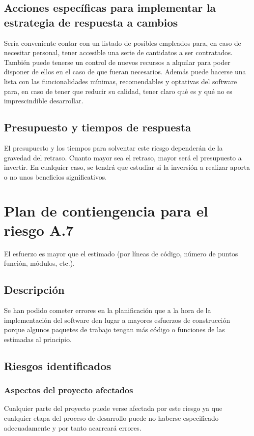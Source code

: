 \documentclass[11pt,a4paper,spanish,twoside]{report}
\begin{document}
\subsection{Acciones específicas para implementar la estrategia de respuesta
a cambios}
Sería conveniente contar con un listado de posibles empleados para, en caso
de necesitar personal, tener accesible una serie de cantidatos a ser
contratados. También puede tenerse un control de nuevos recursos a alquilar
para poder disponer de ellos en el caso de que fueran necesarios. Además
puede hacerse una lista con las funcionalidades mínimas, recomendables y
optativas del software para, en caso de tener que reducir su calidad, tener
claro qué es y qué no es imprescindible desarrollar.

\subsection{Presupuesto y tiempos de respuesta}
El presupuesto y los tiempos para solventar este riesgo dependerán de la
gravedad del retraso. Cuanto mayor sea el retraso, mayor será el presupuesto
a invertir. En cualquier caso, se tendrá que estudiar si la inversión a
realizar aporta o no unos beneficios significativos.


\section{Plan de contiengencia para el riesgo A.7}
El esfuerzo es mayor que el estimado (por líneas de código, número de puntos
función, módulos, etc.).
\subsection{Descripción}
Se han podido cometer errores en la planificación que a la hora de la
implementación del software den lugar a mayores esfuerzos de construcción
porque algunos paquetes de trabajo tengan más código o funciones de las
estimadas al principio.

\subsection{Riesgos identificados}
\subsubsection{Aspectos del proyecto afectados}
Cualquier parte del proyecto puede verse afectada por este riesgo ya que
cualquier etapa del proceso de desarrollo puede no haberse especificado
adecuadamente y por tanto acarreará errores.
\end{document}

